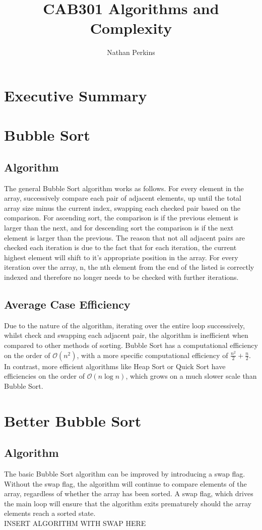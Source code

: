 \documentclass[]{article}
\title{CAB301 Algorithms and Complexity}
\author{Nathan Perkins}
\begin{document}
\maketitle
\tableofcontents
\newpage
\section{Executive Summary}
\section{Bubble Sort}
\subsection{Algorithm}
The general Bubble Sort algorithm works as follows. For every element in the array, successively compare each pair of adjacent elements, up until the total array size minus the current index, swapping each checked pair based on the comparison. For ascending sort, the comparison is if the previous element is larger than the next, and for descending sort the comparison is if the next element is larger than the previous. The reason that not all adjacent pairs are checked each iteration is due to the fact that for each iteration, the current highest element will shift to it's appropriate position in the array. For every iteration over the array, n, the nth element from the end of the listed is correctly indexed and therefore no longer needs to be checked with further iterations.
\subsection{Average Case Efficiency}
Due to the nature of the algorithm, iterating over the entire loop successively, whilst check and swapping each adjacent pair, the algorithm is inefficient when compared to other methods of sorting. Bubble Sort has a computational efficiency on the order of $\mathcal{O}(n^2)$, with a more specific computational efficiency of $\frac{n^2}{2} + \frac{n}{2}$.
\cite{BubbleSort}
In contrast, more efficient algorithms like Heap Sort or Quick Sort have efficiencies on the order of $\mathcal{O}(n\log{}n)$,
which grows on a much slower scale than Bubble Sort.
\cite{HeapSort}
\section{Better Bubble Sort}
\subsection{Algorithm}
The basic Bubble Sort algorithm can be improved by introducing a swap flag. Without the swap flag, the algorithm will continue to compare elements of the array, regardless of whether the array has been sorted. A swap flag, which drives the main loop will ensure that the algorithm exits prematurely should the array elements reach a sorted state. 
\\
INSERT ALGORITHM WITH SWAP HERE
\\
\end{document}
